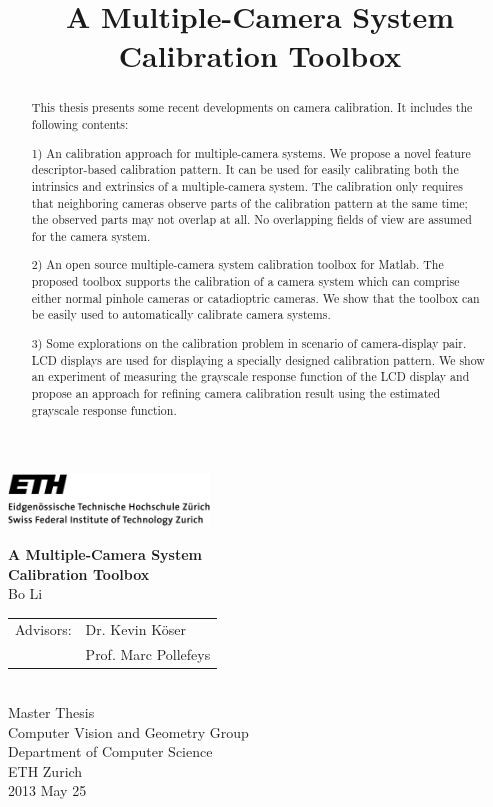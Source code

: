 \documentclass{report}
\title{\LARGE \bf
A Multiple-Camera System Calibration Toolbox
}
\begin{document}

\begin{titlepage}
\noindent \includegraphics[width=0.4\textwidth]{images/ethlogo-print.png}
\vspace*{\fill}
\begin{center}
{\Huge \bf A Multiple-Camera System\\[12pt] Calibration Toolbox}\\[50pt]
{\huge Bo Li}\\[30pt]
\begin{tabular}{cl}
\Large Advisors: & \Large Dr. Kevin K\"oser\\[8pt]
& \Large Prof. Marc Pollefeys
\end{tabular}
\\[100pt]
{\LARGE Master Thesis}\\[25pt]
{\Large Computer Vision and Geometry Group}\\[8pt] 
{\Large Department of Computer Science}\\[8pt]
{\Large ETH Zurich}\\[40pt]
{\Large 2013 May 25}
\end{center}
\vspace*{\fill}
\end{titlepage}

\tableofcontents

\begin{abstract}
This thesis presents some recent developments on camera calibration. It includes the following contents: 

1) An calibration approach for multiple-camera systems. We propose a novel feature descriptor-based calibration pattern. It can be used for easily calibrating both the intrinsics and extrinsics of a multiple-camera system. The calibration only requires that neighboring cameras observe parts of the calibration pattern at the same time; the observed parts may not overlap at all. No overlapping fields of view are assumed for the camera system.

2) An open source multiple-camera system calibration toolbox for Matlab. The proposed toolbox supports the calibration of a camera system which can comprise either normal pinhole cameras or catadioptric cameras. We show that the toolbox can be easily used to automatically calibrate camera systems. 

3) Some explorations on the calibration problem in scenario of camera-display pair. LCD displays are used for displaying a specially designed calibration pattern. We show an experiment of measuring the grayscale response function of the LCD display and propose an approach for refining camera calibration result using the estimated grayscale response function. 


\end{abstract}
\end{document}
